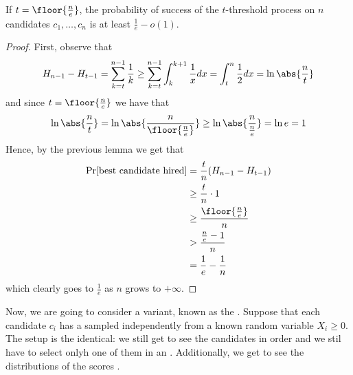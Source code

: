 \documentclass[a4paper, 12pt]{report}
\begin{document}
    \begin{framedthm}{}
        If $t = \floor{\tfrac{n}{e}}$, the probability of success of the $t$-threshold process on $n$ candidates $c_1, \ldots, c_n$ is at least $\tfrac{1}{e} - o(1)$.
    \end{framedthm}

    \begin{proof}
        First, observe that $$H_{n - 1} - H_{t - 1} = \sum_{k = t}^{n - 1}{\dfrac{1}{k}} \ge \sum_{k = t}^{n - 1}{\int_k^{k + 1}{\dfrac{1}{x}dx}} = \int_t^n{\dfrac{1}{2}dx = \ln \abs{\dfrac{n}{t}}}$$ and since $t = \floor{\tfrac{n}{e}}$ we have that $$\ln \abs{\dfrac{n}{t}} = \ln \abs{\dfrac{n}{\floor{\tfrac{n}{e}}}} \ge \ln \abs{\dfrac{n}{\tfrac{n}{e}}} = \ln e = 1$$ Hence, by the previous lemma we get that
        \begin{equation*}
            \begin{split}
                \Pr[\mbox{best candidate hired}] &= \dfrac{t}{n}(H_{n - 1} - H_{t - 1}) \\
                                                 &\ge \dfrac{t}{n} \cdot 1 \\
                                                 &\ge \dfrac{\floor{\tfrac{n}{e}}}{n} \\
                                                 &> \dfrac{\tfrac{n}{e} - 1}{n} \\
                                                 &= \dfrac{1}{e} - \dfrac{1}{n} \\
            \end{split}
        \end{equation*}
        which clearly goes to $\tfrac{1}{e}$ as $n$ grows to $+ \infty$.
    \end{proof}

    Now, we are going to consider a variant, known as the . Suppose that each candidate $c_i$ has a  sampled independently from a known random variable $X_i \ge 0$. The setup is the identical: we still get to see the candidates in order and we stil have to select onlyh one of them in an . Additionally, we get to see the distributions of the scores .
\end{document}
